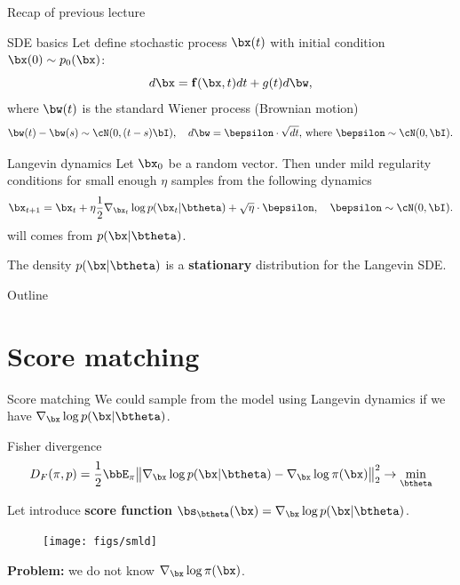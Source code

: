 \begin{frame}{Recap of previous lecture}
	\vspace{-0.2cm}
	\begin{block}{SDE basics}
		Let define stochastic process $\bx(t)$ with initial condition $\bx(0) \sim p_0(\bx)$:
		\[
			d\bx = \mathbf{f}(\bx, t) dt + g(t) d \bw, 
		\]
		where $\bw(t)$ is the standard Wiener process (Brownian motion)
		\vspace{-0.2cm}
		\[		
			\bw(t) - \bw(s) \sim \cN(0, (t - s) \bI), \quad d \bw = \bepsilon \cdot \sqrt{dt}, \, \text{where } \bepsilon \sim \cN(0, \bI).
		\]
	\end{block}
	\vspace{-0.5cm}
	\begin{block}{Langevin dynamics}
		Let $\bx_0$ be a random vector. Then under mild regularity conditions for small enough $\eta$ samples from the following dynamics
		\vspace{-0.2cm}
		\[
			\bx_{t + 1} = \bx_t + \eta \frac{1}{2} \nabla_{\bx_t} \log p(\bx_t | \btheta) + \sqrt{\eta} \cdot \bepsilon, \quad \bepsilon \sim \cN(0, \bI).
		\]
		will comes from $p(\bx | \btheta)$.
	\end{block}
	The density $p(\bx | \btheta)$ is a \textbf{stationary} distribution for the Langevin SDE.
\end{frame}
\begin{frame}{Outline}
	\tableofcontents
\end{frame}
\section{Score matching}
\begin{frame}{Score matching}
	We could sample from the model using Langevin dynamics if we have $\nabla_{\bx}\log p(\bx| \btheta)$.
	\begin{block}{Fisher divergence}
		\vspace{-0.3cm}
		\[
		D_F(\pi, p) = \frac{1}{2}\bbE_{\pi}\bigl\| \nabla_{\bx}\log p(\bx| \btheta) - \nabla_\bx \log \pi(\bx) \bigr\|^2_2 \rightarrow \min_{\btheta}
		\]
		\vspace{-0.5cm}
	\end{block}
	Let introduce \textbf{score function} $\bs_{\btheta}(\bx) = \nabla_{\bx}\log p(\bx| \btheta)$. 
	\vspace{-0.2cm}
	\begin{figure}
		\centering
		\texttt{[image: figs/smld]}
	\end{figure}
	\vspace{-0.3cm} 
	\textbf{Problem:} we do not know $\nabla_\bx \log \pi(\bx)$.
\end{frame}
